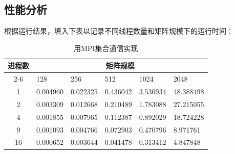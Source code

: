 \documentclass{SYSUReport}
\begin{document}
\subsection{性能分析}
根据运行结果，填入下表以记录不同线程数量和矩阵规模下的运行时间：
\begin{table}[H]
\centering
\label{表1}
\begin{tabular}{|c|lllll|}
\hline
\multirow{2}{*}{进程数} & \multicolumn{5}{c|}{矩阵规模}                                                                        \\ \cline{2-6} 
 & \multicolumn{1}{l|}{128} & \multicolumn{1}{l|}{256} & \multicolumn{1}{l|}{512} & \multicolumn{1}{l|}{1024} & 2048 \\ \hline
1                    & \multicolumn{1}{l|}{0.004960} & \multicolumn{1}{l|}{0.022325} & \multicolumn{1}{l|}{0.436042} & \multicolumn{1}{l|}{3.530934} & 48.388498 \\ \hline
2                    & \multicolumn{1}{l|}{0.003309} & \multicolumn{1}{l|}{0.012668} & \multicolumn{1}{l|}{0.210489} & \multicolumn{1}{l|}{1.783088} & 27.215055 \\ \hline
4                    & \multicolumn{1}{l|}{0.001855} & \multicolumn{1}{l|}{0.007965} & \multicolumn{1}{l|}{0.112387} & \multicolumn{1}{l|}{0.892029} & 18.724228 \\ \hline
9                    & \multicolumn{1}{l|}{0.001093} & \multicolumn{1}{l|}{0.004766} & \multicolumn{1}{l|}{0.072903} & \multicolumn{1}{l|}{0.470796} & 8.971761 \\ \hline
16                   & \multicolumn{1}{l|}{0.000652} & \multicolumn{1}{l|}{0.003644} & \multicolumn{1}{l|}{0.041478} & \multicolumn{1}{l|}{0.313412} & 4.847848 \\ \hline
\end{tabular}
\caption{用MPI集合通信实现}
\end{table}
\end{document}

